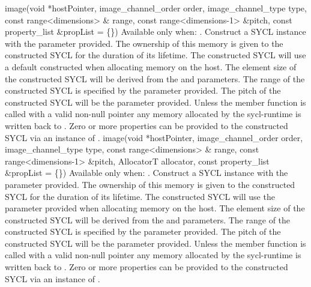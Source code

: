   \addRowSixSL
    {image(void *hostPointer, }
    { image_channel_order order, }
    { image_channel_type type, }
    { const range<dimensions> \& range, }
    { const range<dimensions-1> \&pitch, }
    { const property_list \&propList = \{\}) }
    {
         Available only when: .  
         \newline    
          Construct a SYCL  instance with the  parameter provided. The ownership of this memory is given to the constructed SYCL  for the duration of its lifetime.
         The constructed SYCL  will use a default constructed  when allocating memory on the host.         
         The element size of the constructed SYCL  will be derived from the  and  parameters.
         The range of the constructed SYCL  is specified by the  parameter provided.
         The pitch of the constructed SYCL  will be the  parameter provided.
         Unless the member function  is called with a valid non-null pointer any memory allocated by the \gls{sycl-runtime} is written back to .
         Zero or more properties can be provided to the constructed SYCL  via an instance of .
    }
  \addRowSevenSL
    {image(void *hostPointer, }
    { image_channel_order order, }
    { image_channel_type type, }
    { const range<dimensions> \& range, }
    { const range<dimensions-1> \&pitch, }
    { AllocatorT allocator, }
    { const property_list \&propList = \{\}) }
    {
         Available only when: .  
         \newline    
         Construct a SYCL  instance with the  parameter provided. The ownership of this memory is given to the constructed SYCL  for the duration of its lifetime.
         The constructed SYCL  will use the  parameter provided when allocating memory on the host.
         The element size of the constructed SYCL  will be derived from the  and  parameters.
         The range of the constructed SYCL  is specified by the  parameter provided.
         The pitch of the constructed SYCL  will be the  parameter provided.
         Unless the member function  is called with a valid non-null pointer any memory allocated by the \gls{sycl-runtime} is written back to .
         Zero or more properties can be provided to the constructed SYCL  via an instance of .
    }
